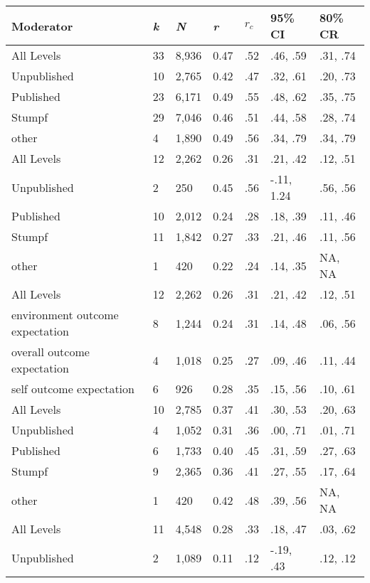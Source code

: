 \begin{table}[ht]
\centering
\begin{tabular}{lllllll}
  \hline
Moderator & \textit{k} & \textit{N} & \textit{r} & \textit{$r_c$} & 95\% CI & 80\% CR \\ 
  \hline
All Levels & 33 &  8,936 & 0.47 & .52 & .46, .59 & .31, .74 \\ 
  Unpublished & 10 &  2,765 & 0.42 & .47 & .32, .61 & .20, .73 \\ 
  Published & 23 &  6,171 & 0.49 & .55 & .48, .62 & .35, .75 \\ 
  Stumpf & 29 &  7,046 & 0.46 & .51 & .44, .58 & .28, .74 \\ 
  other & 4 &  1,890 & 0.49 & .56 & .34, .79 & .34, .79 \\ 
  All Levels & 12 &  2,262 & 0.26 & .31 & .21, .42 & .12, .51 \\ 
  Unpublished & 2 &    250 & 0.45 & .56 & -.11, 1.24 & .56, .56 \\ 
  Published & 10 &  2,012 & 0.24 & .28 & .18, .39 & .11, .46 \\ 
  Stumpf & 11 &  1,842 & 0.27 & .33 & .21, .46 & .11, .56 \\ 
  other & 1 &    420 & 0.22 & .24 & .14, .35 & NA, NA \\ 
  All Levels & 12 &  2,262 & 0.26 & .31 & .21, .42 & .12, .51 \\ 
  environment outcome expectation & 8 &  1,244 & 0.24 & .31 & .14, .48 & .06, .56 \\ 
  overall outcome expectation & 4 &  1,018 & 0.25 & .27 & .09, .46 & .11, .44 \\ 
  self outcome expectation & 6 &    926 & 0.28 & .35 & .15, .56 & .10, .61 \\ 
  All Levels & 10 &  2,785 & 0.37 & .41 & .30, .53 & .20, .63 \\ 
  Unpublished & 4 &  1,052 & 0.31 & .36 & .00, .71 & .01, .71 \\ 
  Published & 6 &  1,733 & 0.40 & .45 & .31, .59 & .27, .63 \\ 
  Stumpf & 9 &  2,365 & 0.36 & .41 & .27, .55 & .17, .64 \\ 
  other & 1 &    420 & 0.42 & .48 & .39, .56 & NA, NA \\ 
  All Levels & 11 &  4,548 & 0.28 & .33 & .18, .47 & .03, .62 \\ 
  Unpublished & 2 &  1,089 & 0.11 & .12 & -.19, .43 & .12, .12 \\ 

\end{tabular}
\end{table}
